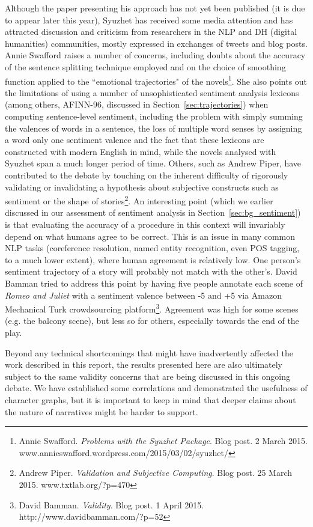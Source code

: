 \documentclass[bsc,frontabs,singlespacing,parskip, twoside]{infthesis}
\begin{document}
Although the paper presenting his approach has not yet been published (it is due to appear later this year), Syuzhet has received some media attention and has attracted discussion and criticism from researchers in the NLP and DH (digital humanities) communities, mostly expressed in exchanges of tweets and blog posts. Annie Swafford raises a number of concerns, including doubts about the accuracy of the sentence splitting technique employed and on the choice of smoothing function applied to the ``emotional trajectories" of the novels\footnote{Annie Swafford. \textit{Problems with the Syuzhet Package}. Blog post. 2 March 2015. www.annieswafford.wordpress.com/2015/03/02/syuzhet/ }. She also points out the limitations of using a number of unsophisticated sentiment analysis lexicons (among others, AFINN-96, discussed in Section~\ref{sec:trajectories}) when computing sentence-level sentiment, including the problem with simply summing the valences of words in a sentence, the loss of multiple word senses by assigning a word only one sentiment valence and the fact that these lexicons are constructed with modern English in mind, while the novels analysed with Syuzhet span a much longer period of time. Others, such as Andrew Piper, have contributed to the debate by touching on the inherent difficulty of rigorously validating or invalidating a hypothesis about subjective constructs such as sentiment or the shape of stories\footnote{Andrew Piper. \textit{Validation and Subjective Computing}. Blog post. 25 March 2015. www.txtlab.org/?p=470}. An interesting point (which we earlier discussed in our assessment of sentiment analysis in Section~\ref{sec:bg_sentiment}) is that evaluating the accuracy of a procedure in this context will invariably depend on what humans agree to be correct. This is an issue in many common NLP tasks (coreference resolution, named entity recognition, even POS tagging, to a much lower extent), where human agreement is relatively low. One person's sentiment trajectory of a story will probably not match with the other's. David Bamman tried to address this point by having five people annotate each scene of \textit{Romeo and Juliet} with a sentiment valence between -5 and +5 via Amazon Mechanical Turk crowdsourcing platform\footnote{David Bamman. \textit{Validity}. Blog post. 1 April 2015. http://www.davidbamman.com/?p=52}. Agreement was high for some scenes (e.g. the balcony scene), but less so for others, especially towards the end of the play.

Beyond any technical shortcomings that might have inadvertently affected the work described in this report, the results presented here are also ultimately subject to the same validity concerns that are being discussed in this ongoing debate. We have established some correlations and demonstrated the usefulness of character graphs, but it is important to keep in mind that deeper claims about the nature of narratives might be harder to support.





\appendix

\end{document}
